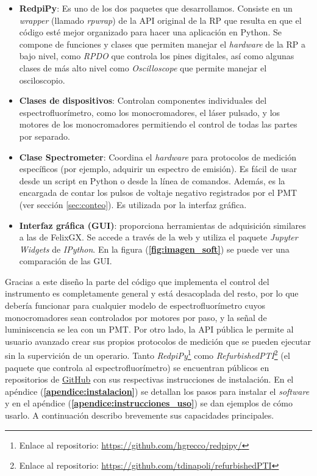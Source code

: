 \begin{itemize}
     \item \textbf{RedpiPy}: Es uno de los dos paquetes que desarrollamos. Consiste en un \textit{wrapper} (llamado \textit{rpwrap}) de la API original de la RP que resulta en que el código esté mejor organizado para hacer una aplicación en Python. Se compone de funciones y clases que permiten manejar el \textit{hardware} de la RP a bajo nivel, como \textit{RPDO} que controla los pines digitales, así como algunas clases de más alto nivel como \textit{Oscilloscope} que permite manejar el osciloscopio.
     \item \textbf{Clases de dispositivos}: Controlan componentes individuales del espectrofluorímetro, como los monocromadores, el láser pulsado, y los motores de los monocromadores permitiendo el control de todas las partes por separado. 
     \item \textbf{Clase Spectrometer}: Coordina el \textit{hardware} para protocolos de medición específicos (por ejemplo, adquirir un espectro de emisión). Es fácil de usar desde un script en Python o desde la línea de comandos. Además, es la encargada de contar los pulsos de voltaje negativo registrados por el PMT (ver sección \ref{sec:conteo}). Es utilizada por la interfaz gráfica.
     \item \textbf{Interfaz gráfica (GUI)}: proporciona herramientas de adquisición similares a las de FelixGX. Se accede a través de la web y utiliza el paquete \textit{Jupyter Widgets} de \textit{IPython}. En la figura (\textbf{\ref{fig:imagen_soft}}) se puede ver una comparación de las GUI.
\end{itemize}

Gracias a este diseño la parte del código que implementa el control del instrumento es completamente general y está desacoplada del resto, por lo que debería funcionar para cualquier modelo de espectrofluorímetro cuyos monocromadores sean controlados por motores por paso, y la señal de luminiscencia se lea con un PMT.
Por otro lado, la API pública le permite al usuario avanzado crear sus propios protocolos de medición que se pueden ejecutar sin la supervición de un operario.
Tanto \textit{RedpiPy}\footnote{Enlace al repositorio: \href{https://github.com/hgrecco/redpipy/}{https://github.com/hgrecco/redpipy/}} como \textit{RefurbishedPTI}\footnote{Enlace al repositorio: \href{https://github.com/tdinapoli/refurbishedPTI}{https://github.com/tdinapoli/refurbishedPTI}} (el paquete que controla al espectrofluorímetro) se encuentran públicos en repositorios de \href{https://github.com}{GitHub} con sus respectivas instrucciones de instalación. 
En el apéndice (\textbf{\ref{apendice:instalacion}}) se detallan los pasos para instalar el \textit{software} y en el apéndice (\textbf{\ref{apendice:instrucciones_uso}}) se dan ejemplos de cómo usarlo.
A continuación describo brevemente sus capacidades principales.

